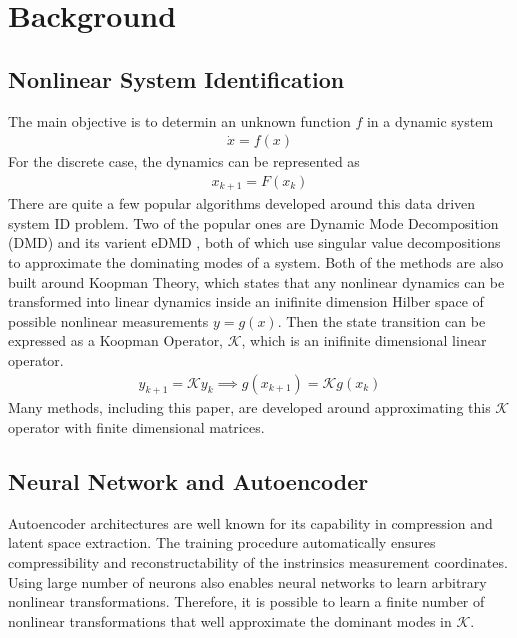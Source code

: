 \documentclass[12pt]{article}
\begin{document}
\section{Background}

\subsection{Nonlinear System Identification}

The main objective is to determin an unknown function $f$ in a dynamic system
\begin{gather}
  \dot{x}= f(x)
\end{gather}
For the discrete case, the dynamics can be represented as
\begin{gather}\label{eqa:discrete}
  x_{k+1} = F(x_k)
\end{gather}
There are quite a few popular algorithms developed around
this data driven system ID problem.
Two of the popular ones are Dynamic Mode Decomposition (DMD) \cite{schmid2010dynamic} and
its varient eDMD \cite{williams2015data}, both of which use singular value decompositions to
approximate the dominating modes of a system. Both of the methods are also built
around Koopman Theory, which states that any nonlinear dynamics can be transformed
into linear dynamics inside an inifinite dimension Hilber space of possible nonlinear
measurements $y = g(x)$. Then the state transition can be expressed as a Koopman Operator,
$\mathcal{K}$, which is an inifinite dimensional linear operator.
\begin{gather}
  y_{k+1} = \mathcal{K}y_k \implies g(x_{k+1}) = \mathcal{K}g(x_k)
\end{gather}
Many methods, including this paper, are developed around
approximating this $\mathcal{K}$ operator with finite dimensional matrices.

\subsection{Neural Network and Autoencoder}

Autoencoder architectures are well known for its capability in compression
and latent space extraction. The training procedure automatically ensures
compressibility and reconstructability of the instrinsics measurement coordinates.
Using large number of neurons also enables neural networks to learn arbitrary nonlinear
transformations. Therefore, it is possible to learn a finite number of nonlinear
transformations that well approximate the dominant modes in $\mathcal{K}$.
\end{document}
